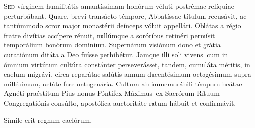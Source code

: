 
\lettrine{S}{ed} vírginem humilitátis amantíssimam
honórum véluti postrémae relíquiae perturbábant.
Quare, brevi transácto témpore, Abbatíssae títulum recusávit,
ac tantúmmodo soror major monastérii deínceps vóluit appellári.
Oblátas a régio fratre divítias accípere rénuit,
nullúmque a soróribus retinéri permísit temporálium bonórum domínium.
Supernárum visiónum dono et grátia curatiónum ditáta a Deo
fuísse perhibétur.
Jamque illi soli vivens, cum in ómnium virtútum cultúra constánter
perseverásset,
tandem, cumuláta méritis, in caelum migrávit circa reparátae salútis
annum ducentésimum octogésimum supra millésimum,
aetáte fere octogenária.
Cultum ab immemorábili témpore beátae Agnéti praéstitum
Pius nonus Póntifex Máximus, ex Sacrórum Rítuum Congregatiónis consúlto,
apostólica auctoritáte ratum hábuit et confirmávit.

Símile erit regnum caelórum,
